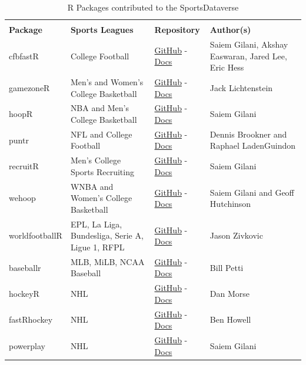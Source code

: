 \documentclass[12pt]{article}
\begin{document}
\begin{table}[!htbp]
\centering
\renewcommand{\arraystretch}{1.3}
\begin{tabular}{>{\raggedright}m{1.0in} >{\raggedright}m{2.2in} >{\centering}m{0.8in} >{\raggedright\arraybackslash}m{2.0in}}
\toprule
\multicolumn{4}{c}{\textbf{R Packages in the SportsDataverse}} \\
\textbf{Package} & \textbf{Sports Leagues} & \textbf{Repository} & \textbf{Author(s)} \\ 
 \midrule
    cfbfastR & College Football & \href{https://github.com/saiemgilani/cfbfastR/}{GitHub} - \href{https://saiemgilani.github.io/cfbfastR/}{Docs} & Saiem Gilani, Akshay Easwaran, Jared Lee, Eric Hess \\
    gamezoneR  & Men's and Women's College Basketball & \href{https://github.com/jacklich10/gamezoneR/}{GitHub} - \href{https://jacklich10.github.io/gamezoneR/}{Docs} & Jack Lichtenstein \\
    hoopR & NBA and Men's College Basketball & \href{https://github.com/saiemgilani/hoopR/}{GitHub} - \href{https://hoopR.sportsdataverse.org}{Docs} & Saiem Gilani \\
    puntr & NFL and College Football & \href{https://github.com/Puntalytics/puntr}{GitHub} - \href{https://puntalytics.github.io/puntr/}{Docs} & Dennis Brookner and Raphael LadenGuindon \\
    recruitR & Men's College Sports Recruiting & \href{https://github.com/saiemgilani/recruitR/}{GitHub} - \href{https://saiemgilani.github.io/recruitR/}{Docs} & Saiem Gilani \\
    wehoop & WNBA and Women's College Basketball & \href{https://github.com/saiemgilani/wehoop}{GitHub} - \href{https://wehoop.sportsdataverse.org}{Docs} & Saiem Gilani and Geoff Hutchinson \\
    worldfootballR & EPL, La Liga, Bundesliga, Serie A, Ligue 1, RFPL & \href{https://github.com/JaseZiv/worldfootballR}{GitHub} - \href{https://jaseziv.github.io/worldfootballR}{Docs} & Jason Zivkovic \\
    baseballr & MLB, MiLB, NCAA Baseball & \href{https://github.com/BillPetti/baseballr/}{GitHub} - \href{https://BillPetti.github.io/baseballr}{Docs} & Bill Petti \\
    hockeyR & NHL & \href{https://github.com/danmorse314/hockeyR/}{GitHub} - \href{https://hockeyr.netlify.app/}{Docs} & Dan Morse \\
    fastRhockey & NHL & \href{https://github.com/BenHowell71/fastRhockey/}{GitHub} - \href{https://BenHowell71.github.io/fastRhockey}{Docs} & Ben Howell \\
    powerplay & NHL & \href{https://github.com/saiemgilani/powerplay}{GitHub} - \href{https://saiemgilani.github.io/powerplay}{Docs} & Saiem Gilani \\
\bottomrule 
\end{tabular}
\vspace{5pt}
\caption{R Packages contributed to the SportsDataverse}
\label{tbl:sdvr}
\vspace{-7mm}
\end{table}
\end{document}
